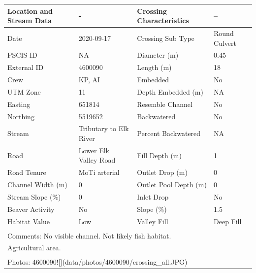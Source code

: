\documentclass[
]{book}
\begin{document}
\begin{tabular}{llll}
\toprule
Location and Stream Data & - & Crossing Characteristics & --\\
\midrule
Date & 2020-09-17 & Crossing Sub Type & Round Culvert\\
PSCIS ID & NA & Diameter (m) & 0.45\\
External ID & 4600090 & Length (m) & 18\\
Crew & KP, AI & Embedded & No\\
UTM Zone & 11 & Depth Embedded (m) & NA\\
\addlinespace
Easting & 651814 & Resemble Channel & No\\
Northing & 5519652 & Backwatered & No\\
Stream & Tributary to Elk River & Percent Backwatered & NA\\
Road & Lower Elk Valley Road & Fill Depth (m) & 1\\
Road Tenure & MoTi arterial & Outlet Drop (m) & 0\\
\addlinespace
Channel Width (m) & 0 & Outlet Pool Depth (m) & 0\\
Stream Slope (\%) & 0 & Inlet Drop & No\\
Beaver Activity & No & Slope (\%) & 1.5\\
Habitat Value & Low & Valley Fill & Deep Fill\\
\bottomrule
\multicolumn{4}{l}{\textsuperscript{} Comments: No visible channel. Not likely fish habitat.}\\
\multicolumn{4}{l}{Agricultural area.}\\
\multicolumn{4}{l}{\textsuperscript{} Photos: 4600090![](data/photos/4600090/crossing\_all.JPG)}\\
\end{tabular}
\end{document}
